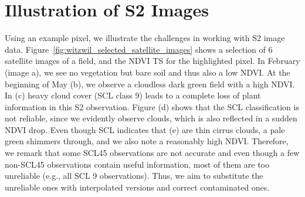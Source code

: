 		
\section{Illustration of S2 Images}{\label{sec:s2_challangges}
	
	Using an example pixel, we illustrate the challenges in working with S2 image data. Figure~\ref{fig:witzwil_selected_satellite_images} shows a selection of 6 satellite images of a field, and the NDVI {TS} for the highlighted pixel. 
	In February (image a), we see no vegetation but bare soil and thus also a low NDVI. At the beginning of May (b), we observe a cloudless dark green field with a high NDVI. In (c) heavy cloud cover (SCL class 9) leads to a complete loss of plant information in this S2 observation. Figure (d) shows that the SCL classification is not reliable, since we evidently observe clouds, which is also reflected in a sudden NDVI drop. Even though SCL indicates that (e) are thin cirrus clouds, a pale green shimmers through, and we also note a reasonably high NDVI. Therefore, we remark that some SCL45 observations are not accurate and even though a few non-SCL45 observations contain useful information, most of them are too unreliable (e.g., all SCL 9 observations). Thus, we aim to substitute the unreliable ones with interpolated versions and correct contaminated ones.
		
}

